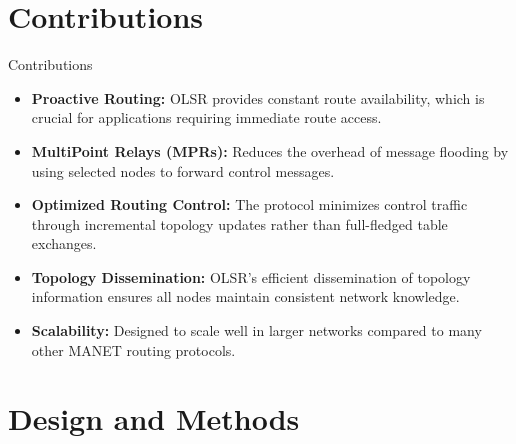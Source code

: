 \documentclass[11pt]{beamer}              %
\begin{document}
\section{Contributions}
\begin{frame}{Contributions}
    \begin{itemize}
        \item \textbf{Proactive Routing:} OLSR provides constant route availability, which is crucial for applications requiring immediate route access.
        \item \textbf{MultiPoint Relays (MPRs):} Reduces the overhead of message flooding by using selected nodes to forward control messages.
        \item \textbf{Optimized Routing Control:} The protocol minimizes control traffic through incremental topology updates rather than full-fledged table exchanges.
        \item \textbf{Topology Dissemination:} OLSR's efficient dissemination of topology information ensures all nodes maintain consistent network knowledge.
        \item \textbf{Scalability:} Designed to scale well in larger networks compared to many other MANET routing protocols.
    \end{itemize}
\end{frame}


\section{Design and Methods}
\end{document}
